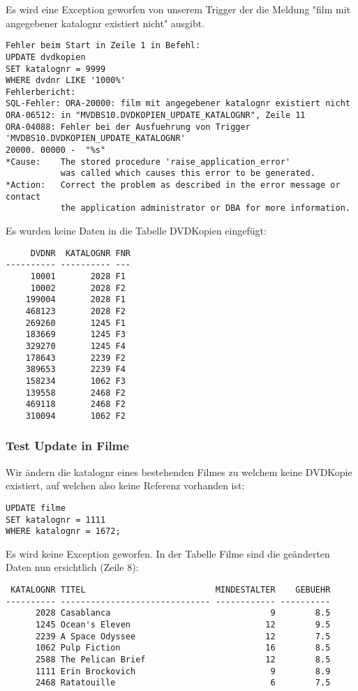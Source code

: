\documentclass[11pt,a4paper,parskip=half]{scrartcl}
\begin{document}
Es wird eine Exception geworfen von unserem Trigger der die Meldung "film mit angegebener katalognr existiert nicht" ausgibt.

\begin{lstlisting}
Fehler beim Start in Zeile 1 in Befehl:
UPDATE dvdkopien
SET katalognr = 9999
WHERE dvdnr LIKE '1000%'
Fehlerbericht:
SQL-Fehler: ORA-20000: film mit angegebener katalognr existiert nicht
ORA-06512: in "MVDBS10.DVDKOPIEN_UPDATE_KATALOGNR", Zeile 11
ORA-04088: Fehler bei der Ausfuehrung von Trigger 'MVDBS10.DVDKOPIEN_UPDATE_KATALOGNR'
20000. 00000 -  "%s"
*Cause:    The stored procedure 'raise_application_error'
           was called which causes this error to be generated.
*Action:   Correct the problem as described in the error message or contact
           the application administrator or DBA for more information.
\end{lstlisting}

Es wurden keine Daten in die Tabelle DVDKopien eingefügt:

\begin{lstlisting}
     DVDNR  KATALOGNR FNR
---------- ---------- ---
     10001       2028 F1  
     10002       2028 F2  
    199004       2028 F1  
    468123       2028 F2  
    269260       1245 F1  
    183669       1245 F3  
    329270       1245 F4  
    178643       2239 F2  
    389653       2239 F4  
    158234       1062 F3  
    139558       2468 F2  
    469118       2468 F2  
    310094       1062 F2  
\end{lstlisting}

\subsubsection{Test Update in Filme}
Wir ändern die katalognr eines bestehenden Filmes zu welchem keine DVDKopie existiert, auf welchen also keine Referenz vorhanden ist:

\begin{lstlisting}
UPDATE filme
SET katalognr = 1111
WHERE katalognr = 1672;
\end{lstlisting}

Es wird keine Exception geworfen. In der Tabelle Filme sind die geänderten Daten nun ersichtlich (Zeile 8):

\begin{lstlisting}
 KATALOGNR TITEL                          MINDESTALTER    GEBUEHR
---------- ------------------------------ ------------ ----------
      2028 Casablanca                                9        8.5 
      1245 Ocean's Eleven                           12        9.5 
      2239 A Space Odyssee                          12        7.5 
      1062 Pulp Fiction                             16        8.5 
      2588 The Pelican Brief                        12        8.5 
      1111 Erin Brockovich                           9        8.9 
      2468 Ratatouille                               6        7.5 
\end{lstlisting}
\end{document}

